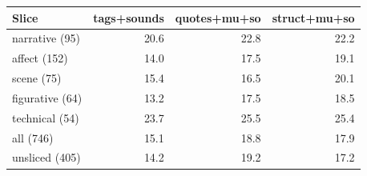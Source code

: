 \begin{tabular}{lrrr}
\toprule
Slice & tags+sounds & quotes+mu+so & struct+mu+so \\
\midrule
narrative (95) & 20.6 & 22.8 & 22.2 \\
affect (152) & 14.0 & 17.5 & 19.1 \\
scene (75) & 15.4 & 16.5 & 20.1 \\
figurative (64) & 13.2 & 17.5 & 18.5 \\
technical (54) & 23.7 & 25.5 & 25.4 \\
\midrule
all (746) & 15.1 & 18.8 & 17.9 \\
\midrule
unsliced (405) & 14.2 & 19.2 & 17.2 \\
\bottomrule
\end{tabular}
